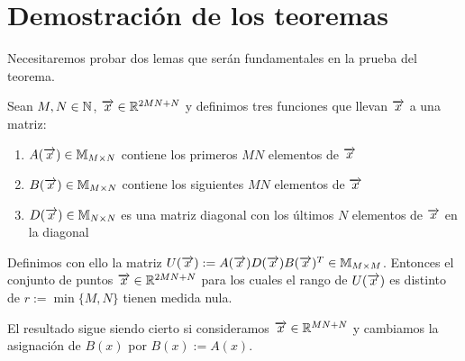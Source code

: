 \section{Demostración de los teoremas}

Necesitaremos probar dos lemas que serán fundamentales en la prueba del teorema.

\begin{lema} \label{lema:primer_lema}

    Sean $M, N \in \mathbb{N}$, $\overrightarrow{x} \in \mathbb{R}^{2MN + N}$ y definimos tres funciones que llevan $\overrightarrow{x}$ a una matriz:

    \begin{enumerate}
        \item $A(\overrightarrow{x}) \in \mathbb{M}_{M \times N}$ contiene los primeros $MN$ elementos de $\overrightarrow{x}$
        \item $B(\overrightarrow{x}) \in \mathbb{M}_{M \times N}$ contiene los siguientes $MN$ elementos de $\overrightarrow{x}$
        \item $D(\overrightarrow{x}) \in \mathbb{M}_{N \times N}$ es una matriz diagonal con los últimos $N$ elementos de $\overrightarrow{x}$ en la diagonal
    \end{enumerate}

    Definimos con ello la matriz $U(\overrightarrow{x}) := A(\overrightarrow{x}) D(\overrightarrow{x}) B(\overrightarrow{x})^T \in \mathbb{M}_{M \times M}$. Entonces el conjunto de puntos $\overrightarrow{x} \in \mathbb{R}^{2MN + N}$ para los cuales el rango de $U(\overrightarrow{x})$ es distinto de $r := \min \{M, N\}$ tienen medida nula.

    El resultado sigue siendo cierto si consideramos $\overrightarrow{x} \in \mathbb{R}^{MN+N}$ y cambiamos la asignación de $B(x)$ por $B(x) := A(x)$.
\end{lema}

